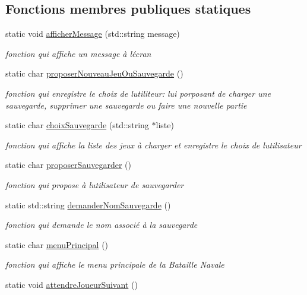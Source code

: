 \subsection*{Fonctions membres publiques statiques}
\begin{DoxyCompactItemize}
\item 
static void \hyperlink{class_affichage_a42638bc4919117919424b77d78793b5b}{afficher\+Message} (std\+::string message)
\begin{DoxyCompactList}\small\item\em fonction qui affiche un message à l\textquotesingle{}écran \end{DoxyCompactList}\item 
static char \hyperlink{class_affichage_ae27cd9961a933077a71790e55c3a0e2d}{proposer\+Nouveau\+Jeu\+Ou\+Sauvegarde} ()
\begin{DoxyCompactList}\small\item\em fonction qui enregistre le choix de l\textquotesingle{}utiliteur\+: lui porposant de charger une sauvegarde, supprimer une sauvegarde ou faire une nouvelle partie \end{DoxyCompactList}\item 
static char \hyperlink{class_affichage_a37978f1f21c0e15e6e5c92d661a99618}{choix\+Sauvegarde} (std\+::string $\ast$liste)
\begin{DoxyCompactList}\small\item\em fonction qui affiche la liste des jeux à charger et enregistre le choix de l\textquotesingle{}utilisateur \end{DoxyCompactList}\item 
static char \hyperlink{class_affichage_abcc7bec6baf155ab0500b0c134f46f3f}{proposer\+Sauvegarder} ()
\begin{DoxyCompactList}\small\item\em fonction qui propose à l\textquotesingle{}utilisateur de sauvegarder \end{DoxyCompactList}\item 
static std\+::string \hyperlink{class_affichage_a8d572996e22f9d78eb56b01eb9142871}{demander\+Nom\+Sauvegarde} ()
\begin{DoxyCompactList}\small\item\em fonction qui demande le nom associé à la sauvegarde \end{DoxyCompactList}\item 
static char \hyperlink{class_affichage_af895f714f818a9897830275d6db7ee0c}{menu\+Principal} ()
\begin{DoxyCompactList}\small\item\em fonction qui affiche le menu principale de la Bataille Navale \end{DoxyCompactList}\item 
static void \hyperlink{class_affichage_a111be8fcb09e0fe04c0543c814713a88}{attendre\+Joueur\+Suivant} ()\hypertarget{class_affichage_a111be8fcb09e0fe04c0543c814713a88}{}\label{class_affichage_a111be8fcb09e0fe04c0543c814713a88}


\end{DoxyCompactItemize}
